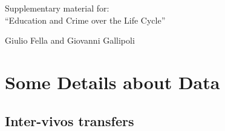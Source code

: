 \documentclass[a4paper,dvips,12pt]{article}
\begin{document}
\begin{center}
{\Large
Supplementary material for: \\ ``Education and Crime over the Life Cycle''}
\bigskip

Giulio Fella and Giovanni Gallipoli
\end{center}
\setcounter{section}{0}
\setcounter{page}{1}
\setcounter{equation}{0}
\setcounter{figure}{0}
\setcounter{table}{0}
\bigskip

\section*{Some Details about Data}

\subsection*{Inter-vivos transfers}
\label{NLSY97 Appendix}
\end{document}
